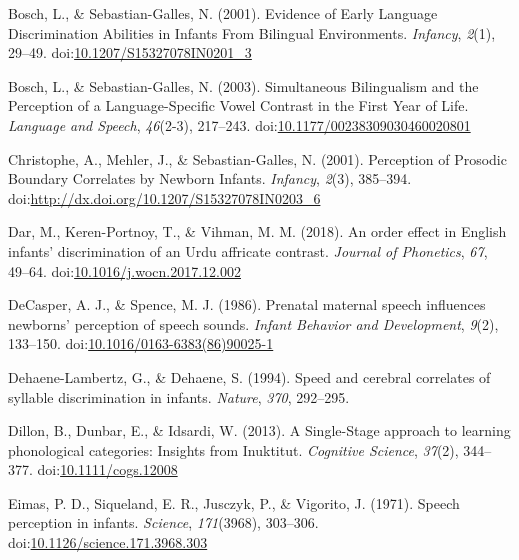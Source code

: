 \documentclass[man,floatsintext]{apa6}
\begin{document}
\leavevmode\hypertarget{ref-bosch2001}{}%
Bosch, L., \& Sebastian-Galles, N. (2001). Evidence of Early Language Discrimination Abilities in Infants From Bilingual Environments. \emph{Infancy}, \emph{2}(1), 29--49. doi:\href{https://doi.org/10.1207/S15327078IN0201_3}{10.1207/S15327078IN0201\_3}

\leavevmode\hypertarget{ref-bosch2003}{}%
Bosch, L., \& Sebastian-Galles, N. (2003). Simultaneous Bilingualism and the Perception of a Language-Specific Vowel Contrast in the First Year of Life. \emph{Language and Speech}, \emph{46}(2-3), 217--243. doi:\href{https://doi.org/10.1177/00238309030460020801}{10.1177/00238309030460020801}

\leavevmode\hypertarget{ref-christophe2001}{}%
Christophe, A., Mehler, J., \& Sebastian-Galles, N. (2001). Perception of Prosodic Boundary Correlates by Newborn Infants. \emph{Infancy}, \emph{2}(3), 385--394. doi:\href{https://doi.org/http://dx.doi.org/10.1207/S15327078IN0203_6}{http://dx.doi.org/10.1207/S15327078IN0203\_6}

\leavevmode\hypertarget{ref-dar2018}{}%
Dar, M., Keren-Portnoy, T., \& Vihman, M. M. (2018). An order effect in English infants' discrimination of an Urdu affricate contrast. \emph{Journal of Phonetics}, \emph{67}, 49--64. doi:\href{https://doi.org/10.1016/j.wocn.2017.12.002}{10.1016/j.wocn.2017.12.002}

\leavevmode\hypertarget{ref-decasper1986}{}%
DeCasper, A. J., \& Spence, M. J. (1986). Prenatal maternal speech influences newborns' perception of speech sounds. \emph{Infant Behavior and Development}, \emph{9}(2), 133--150. doi:\href{https://doi.org/10.1016/0163-6383(86)90025-1}{10.1016/0163-6383(86)90025-1}

\leavevmode\hypertarget{ref-dehaenelambertz1994}{}%
Dehaene-Lambertz, G., \& Dehaene, S. (1994). Speed and cerebral correlates of syllable discrimination in infants. \emph{Nature}, \emph{370}, 292--295.

\leavevmode\hypertarget{ref-dillon2013}{}%
Dillon, B., Dunbar, E., \& Idsardi, W. (2013). A Single-Stage approach to learning phonological categories: Insights from Inuktitut. \emph{Cognitive Science}, \emph{37}(2), 344--377. doi:\href{https://doi.org/10.1111/cogs.12008}{10.1111/cogs.12008}

\leavevmode\hypertarget{ref-eimas1971}{}%
Eimas, P. D., Siqueland, E. R., Jusczyk, P., \& Vigorito, J. (1971). Speech perception in infants. \emph{Science}, \emph{171}(3968), 303--306. doi:\href{https://doi.org/10.1126/science.171.3968.303}{10.1126/science.171.3968.303}
\end{document}
